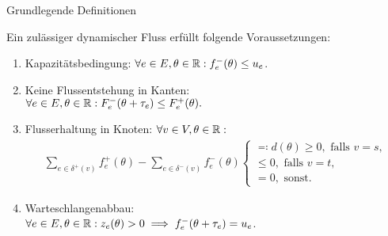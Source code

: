 \begin{frame}{Grundlegende Definitionen}
	\begin{definition}
		Ein zulässiger dynamischer Fluss erfüllt folgende Voraussetzungen:
		\begin{enumerate}[leftmargin=2.5em, label=(F\arabic*)]
			\pause\item\label{def-feasible-flow-capacity} Kapazitätsbedingung: $\forall e\in E, \theta\in\mathbb{R}: f_e^-(\theta)\leq u_e$.
			\pause\item\label{def-feasible-flow-no-negative-flow} Keine Flussentstehung in Kanten:\\ $\forall e\in E, \theta\in\mathbb{R}: F_e^-(\theta + \tau_e) \leq F_e^+(\theta).$
			\pause\item\label{def-feasible-flow-no-flow-at-node} Flusserhaltung in Knoten: $\forall v\in V, \theta\in\mathbb{R}:$
			\setlength{\belowdisplayskip}{0em}			\setlength{\abovedisplayskip}{0em}
			\begin{align*}
			  \sum_{e\in\delta^+(v)}f^+_e(\theta) - \sum_{e\in\delta^-(v)} f_e^-(\theta) \begin{cases}
					\eqcolon d(\theta) \geq 0, \text{ falls $v=s$,}\\
					\leq 0, \text{ falls $v=t$,}\\
					= 0, \text{ sonst.}
				\end{cases}
			\end{align*}
			
			\pause\item\label{def-feasible-flow-queue-with-capacity} Warteschlangenabbau:\\
			$\forall e\in E, \theta\in\mathbb{R}: z_e(\theta) > 0 \implies f_e^-(\theta + \tau_e) = u_e$.
		\end{enumerate}
	\end{definition}
\end{frame}
